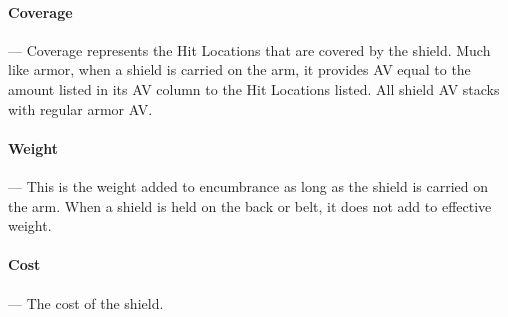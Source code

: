\documentclass[oneside,11pt,english]{book}
\begin{document}
\vspace{-10pt}\paragraph{Coverage} ---\quad
Coverage represents the Hit Locations that are covered by the shield. Much like armor, when a shield is 
carried on the arm, it provides AV equal to the amount listed in its AV column to the Hit Locations listed. 
All shield AV stacks with regular armor AV. 

\vspace{-10pt}\paragraph{Weight}---\quad
This is the weight added to encumbrance as long as the shield is carried on the arm. When a shield is held 
on the back or belt, it does not add to effective weight. 

\vspace{-10pt}\paragraph{Cost}---\quad
The cost of the shield.
\newpage
\end{document}
